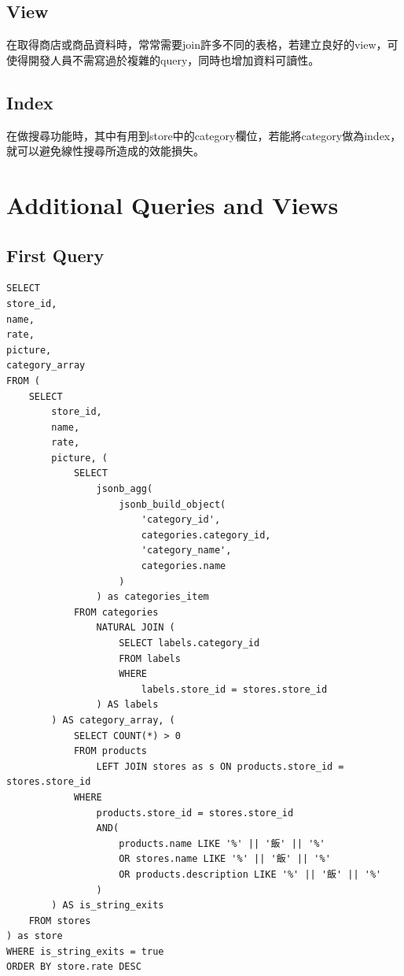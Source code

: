 \documentclass[a4paper, 12pt]{article}
\begin{document}
\subsection{View}
    在取得商店或商品資料時，常常需要join許多不同的表格，若建立良好的view，可使得開發人員不需寫過於複雜的query，同時也增加資料可讀性。
\subsection{Index}
    在做搜尋功能時，其中有用到store中的category欄位，若能將category做為index，就可以避免線性搜尋所造成的效能損失。

\newpage

\section{Additional Queries and Views}

\subsection{First Query}

\begin{lstlisting}
SELECT
store_id,
name,
rate,
picture,
category_array
FROM (
    SELECT
        store_id,
        name,
        rate,
        picture, (
            SELECT
                jsonb_agg(
                    jsonb_build_object(
                        'category_id',
                        categories.category_id,
                        'category_name',
                        categories.name
                    )
                ) as categories_item
            FROM categories
                NATURAL JOIN (
                    SELECT labels.category_id
                    FROM labels
                    WHERE
                        labels.store_id = stores.store_id
                ) AS labels
        ) AS category_array, (
            SELECT COUNT(*) > 0
            FROM products
                LEFT JOIN stores as s ON products.store_id = stores.store_id
            WHERE
                products.store_id = stores.store_id
                AND(
                    products.name LIKE '%' || '飯' || '%'
                    OR stores.name LIKE '%' || '飯' || '%'
                    OR products.description LIKE '%' || '飯' || '%'
                )
        ) AS is_string_exits
    FROM stores
) as store
WHERE is_string_exits = true
ORDER BY store.rate DESC
\end{lstlisting}
\end{document}

